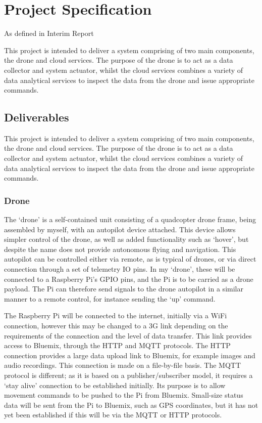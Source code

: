 \documentclass{article}
\begin{document}
\section{Project Specification}
As defined in Interim Report  \

This project is intended to deliver a system comprising of two main components, the drone and cloud services. The purpose of the drone is to act as a data collector and system actuator, whilst the cloud services combines a variety of data analytical services to inspect the data from the drone and issue appropriate commands.

\subsection{Deliverables}
This project is intended to deliver a system comprising of two main components, the drone and cloud services. The purpose of the drone is to act as a data collector and system actuator, whilst the cloud services combines a variety of data analytical services to inspect the data from the drone and issue appropriate commands.
\subsubsection{Drone}
The `drone' is a self-contained unit consisting of a quadcopter drone frame, being assembled by myself, with an autopilot device attached. This device allows simpler control of the drone, as well as added functionality such as `hover', but despite the name does not provide autonomous flying and navigation. This autopilot can be controlled either via remote, as is typical of drones, or via direct connection through a set of telemetry IO pins. In my `drone', these  will be connected to a Raspberry Pi's GPIO pins, and the Pi is to be carried as a drone payload. The Pi can therefore send signals to the drone autopilot in a similar manner to a remote control, for instance sending the `up' command.

\vspace{\baselineskip} \noindent
The Raspberry Pi will be connected to the internet, initially via a WiFi connection, however this may be changed to a 3G link depending on the requirements of the connection and the level of data transfer. This link provides access to Bluemix, through the HTTP and MQTT protocols. The HTTP connection provides a large data upload link to Bluemix, for example images and audio recordings. This connection is made on a file-by-file basis. The MQTT protocol is different; as it is based on a publisher/subscriber model, it requires a `stay alive' connection to be established initially. Its purpose is to allow movement commands to be pushed to the Pi from Bluemix. Small-size status data will be sent from the Pi to Bluemix, such as GPS coordinates, but it has not yet been established if this will be via the MQTT or HTTP protocols.
\end{document}
